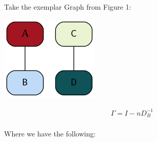\documentclass[11pt]{article}
\begin{document}
Take the exemplar Graph from Figure 1:


\begin{center}
\includegraphics[width=.9\linewidth]{./Media/Example.png}
\end{center}



\begin{align}
    \Gamma =  I - n D^{- 1}_B \\
\end{align}

Where we have the following:
\end{document}
